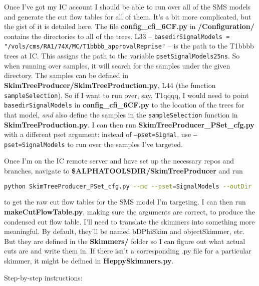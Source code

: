 Once I've got my IC account I should be able to run over all of the SMS models and generate the cut flow tables for all of them. It's a bit more complicated, but the gist of it is detailed here. The file \textbf{config\_cfi\_6CF.py} in \textbf{/Configuration/} contains the directories to all of the trees. L33 -- \texttt{basedirSignalModels = "/vols/cms/RA1/74X/MC/T1bbbb\_approvalReprise"} -- is the path to the T1bbbb trees at IC. This assigns the path to the variable \texttt{psetSignalModels25ns}. So when running over samples, it will search for the samples under the given directory. The samples can be defined in \textbf{SkimTreeProducer/SkimTreeProduction.py}, L44 (the function \texttt{sampleSelection}). So if I want to run over, say, T1qqqq, I would need to point \texttt{basedirSignalModels} in \textbf{config\_cfi\_6CF.py} to the location of the trees for that model, \emph{and} also define the samples in the \texttt{sampleSelection} function in \textbf{SkimTreeProduction.py}. I can then run \textbf{SkimTreeProducer\_PSet\_cfg.py} with a different pset argument: instead of \texttt{--pset=Signal}, use \texttt{--pset=SignalModels} to run over the samples I've targeted.

Once I'm on the IC remote server and have set up the necessary repos and branches, navigate to \textbf{\$ALPHATOOLSDIR/SkimTreeProducer} and run

\begin{lstlisting}[belowskip=-0.7cm, language=sh, numbers=none]
python SkimTreeProducer_PSet_cfg.py --mc --pset=SignalModels --outDir ./
\end{lstlisting}

to get the raw cut flow tables for the SMS model I'm targeting. I can then run \textbf{makeCutFlowTable.py}, making sure the arguments are correct, to produce the condensed cut flow table. I'll need to translate the skimmers into something more meaningful. By default, they'll be named bDPhiSkim and objectSkimmer, etc. But they are defined in the \textbf{Skimmers/} folder so I can figure out what actual cuts are and write them in. If there isn't a corresponding .py file for a particular skimmer, it might be defined in \textbf{HeppySkimmers.py}.

Step-by-step instructions:

